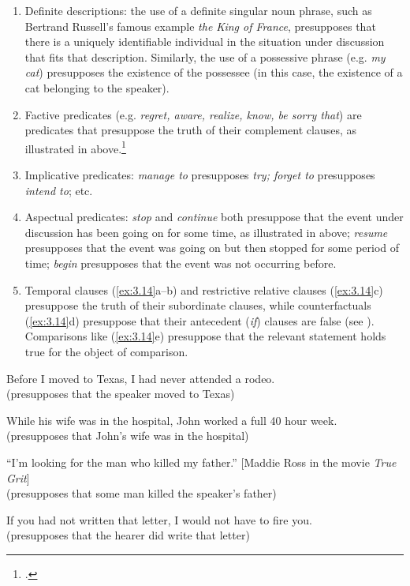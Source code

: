 \begin{enumerate}[label=\alph*.]
\item Definite descriptions: the use of a definite singular noun phrase, such as Bertrand Russell’s famous example \textit{the King of France}, presupposes that there is a uniquely identifiable individual in the situation under discussion that fits that description. Similarly, the use of a possessive phrase (e.g. \textit{my cat}) presupposes the existence of the possessee (in this case, the existence of a cat belonging to the speaker).
\item Factive predicates (e.g. \textit{regret, aware, realize, know, be sorry that}) are predicates that presuppose the truth of their complement clauses, as illustrated in  above.\footnote{\citet{KiparskyKiparsky1970}.}
\item Implicative predicates: \textit{manage to} presupposes \textit{try; forget to} presupposes \textit{intend to}; etc.
\item Aspectual predicates: \textit{stop} and \textit{continue} both presuppose that the event under discussion has been going on for some time, as illustrated in  above; \textit{resume} presupposes that the event was going on but then stopped for some period of time; \textit{begin} presupposes that the event was not occurring before.
\item Temporal clauses (\ref{ex:3.14}a--b) and restrictive relative clauses (\ref{ex:3.14}c) presuppose the truth of their subordinate clauses, while counterfactuals (\ref{ex:3.14}d) presuppose that their antecedent (\textit{if}) clauses are false (see ). Comparisons like (\ref{ex:3.14}e) presuppose that the relevant statement holds true for the object of comparison.
\end{enumerate}

\ea \label{ex:3.14}
\ea Before I moved to Texas, I had never attended a rodeo.\\
  (presupposes that the speaker moved to Texas)

  \ex While his wife was in the hospital, John worked a full 40 hour week.\\
  (presupposes that John’s wife was in the hospital)

  \ex “I’m looking for the man who killed my father.”   [Maddie Ross in the movie \textit{True Grit}]\\
  (presupposes that some man killed the speaker’s father)

  \ex If you had not written that letter, I would not have to fire you.\\
  (presupposes that the hearer did write that letter) 

